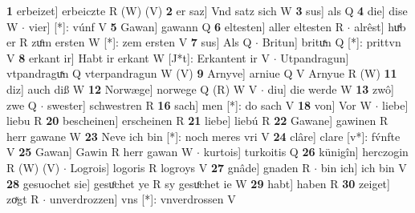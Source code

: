 \documentclass[8pt,a4paper,notitlepage]{article}
\begin{document}
\begin{table}[ht]
\begin{minipage}[t]{0.5\linewidth}
\textbf{1} erbeizet] erbeiczte R (W) (V) \textbf{2} er saz] Vnd satz sich W \textbf{3} sus] als Q \textbf{4} die] dise W  $\cdot$ vier] [*]: vúnf V \textbf{5} Gawan] gawann Q \textbf{6} eltesten] aller eltesten R  $\cdot$ alrêst] huͯb er R zuͦm ersten W [*]: zem ersten V \textbf{7} sus] Als Q  $\cdot$ Britun] brituͯn Q [*]: prittvn V \textbf{8} erkant ir] Habt ir erkant W [J*t]: Erkantent ir V  $\cdot$ Utpandragun] vtpandraguͯn Q vterpandragun W (V) \textbf{9} Arnyve] arniue Q V Arnyue R (W) \textbf{11} diz] auch diß W \textbf{12} Norwæge] norwege Q (R) W V  $\cdot$ diu] die werde W \textbf{13} zwô] zwe Q  $\cdot$ swester] schwestren R \textbf{16} sach] men [*]: do sach V \textbf{18} von] Vor W  $\cdot$ liebe] liebu R \textbf{20} bescheinen] erscheinen R \textbf{21} liebe] liebú R \textbf{22} Gawane] gawinen R herr gawane W \textbf{23} Neve ich bin [*]: noch meres vri V \textbf{24} clâre] clare [v*]: fv́nfte V \textbf{25} Gawan] Gawin R herr gawan W  $\cdot$ kurtois] turkoitis Q \textbf{26} künigîn] herczogin R (W) (V)  $\cdot$ Logrois] logoris R logroys V \textbf{27} gnâde] gnaden R  $\cdot$ bin ich] ich bin V \textbf{28} gesuochet sie] gesuͦchet ye R sy gesuͦchet ie W \textbf{29} habt] haben R \textbf{30} zeiget] zoͯgt R  $\cdot$ unverdrozzen] vns [*]: vnverdrossen V \newline
\end{minipage}
\end{table}
\end{document}
